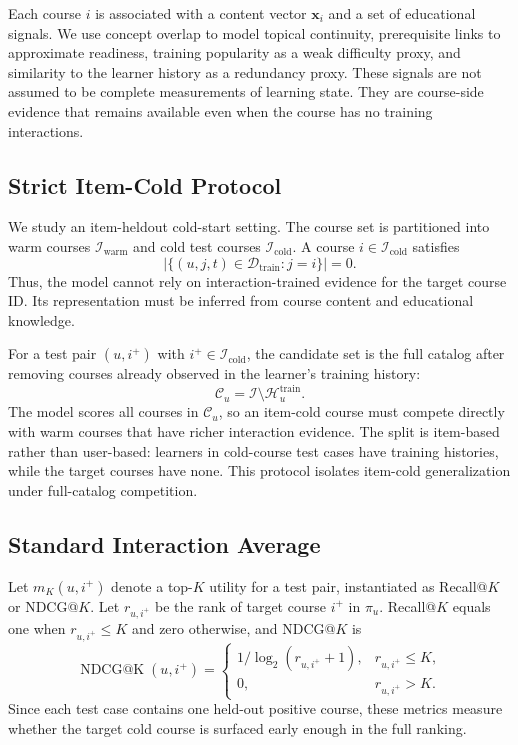 \documentclass[sigconf,anonymous,review]{acmart}
\begin{document}
Each course \(i\) is associated with a content vector \(\mathbf{x}_i\) and a set of educational signals. We use concept overlap to model topical continuity, prerequisite links to approximate readiness, training popularity as a weak difficulty proxy, and similarity to the learner history as a redundancy proxy. These signals are not assumed to be complete measurements of learning state. They are course-side evidence that remains available even when the course has no training interactions.

\subsection{Strict Item-Cold Protocol}
We study an item-heldout cold-start setting. The course set is partitioned into warm courses \(\mathcal{I}_{\mathrm{warm}}\) and cold test courses \(\mathcal{I}_{\mathrm{cold}}\). A course \(i \in \mathcal{I}_{\mathrm{cold}}\) satisfies
\begin{equation}
|\{(u,j,t)\in \mathcal{D}_{\mathrm{train}}: j=i\}|=0.
\end{equation}
Thus, the model cannot rely on interaction-trained evidence for the target course ID. Its representation must be inferred from course content and educational knowledge.

For a test pair \((u,i^+)\) with \(i^+\in\mathcal{I}_{\mathrm{cold}}\), the candidate set is the full catalog after removing courses already observed in the learner's training history:
\begin{equation}
\mathcal{C}_u=\mathcal{I}\setminus \mathcal{H}^{\mathrm{train}}_u .
\end{equation}
The model scores all courses in \(\mathcal{C}_u\), so an item-cold course must compete directly with warm courses that have richer interaction evidence. The split is item-based rather than user-based: learners in cold-course test cases have training histories, while the target courses have none. This protocol isolates item-cold generalization under full-catalog competition.

\subsection{Standard Interaction Average}
Let \(m_K(u,i^+)\) denote a top-\(K\) utility for a test pair, instantiated as Recall@\(K\) or NDCG@\(K\). Let \(r_{u,i^+}\) be the rank of target course \(i^+\) in \(\pi_u\). Recall@\(K\) equals one when \(r_{u,i^+}\le K\) and zero otherwise, and NDCG@\(K\) is
\begin{equation}
\operatorname{NDCG@K}(u,i^+)=
\begin{cases}
1/\log_2(r_{u,i^+}+1), & r_{u,i^+}\le K,\\
0, & r_{u,i^+}>K.
\end{cases}
\end{equation}
Since each test case contains one held-out positive course, these metrics measure whether the target cold course is surfaced early enough in the full ranking.
\end{document}
